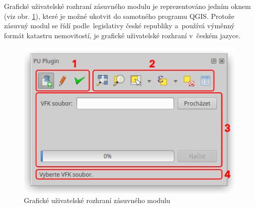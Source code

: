 Grafické uživatelské rozhraní zásuvného modulu je reprezentováno jedním oknem (viz obr. \ref{fig:main_gui}), které je možné ukotvit do samotného programu QGIS. Protože zásuvný modul se řídí podle~legislativy české republiky a~používá výměnný formát katastru nemovitostí, je grafické uživatelské rozhraní v~českém jazyce.

	\begin{figure}[H]
		\centering
		\includegraphics[width=.55\textwidth]{./pictures/main_gui.png}
		\caption[Grafické uživatelské rozhraní zásuvného modulu]{Grafické uživatelské rozhraní zásuvného modulu}
		\label{fig:main_gui}
 	\end{figure}

